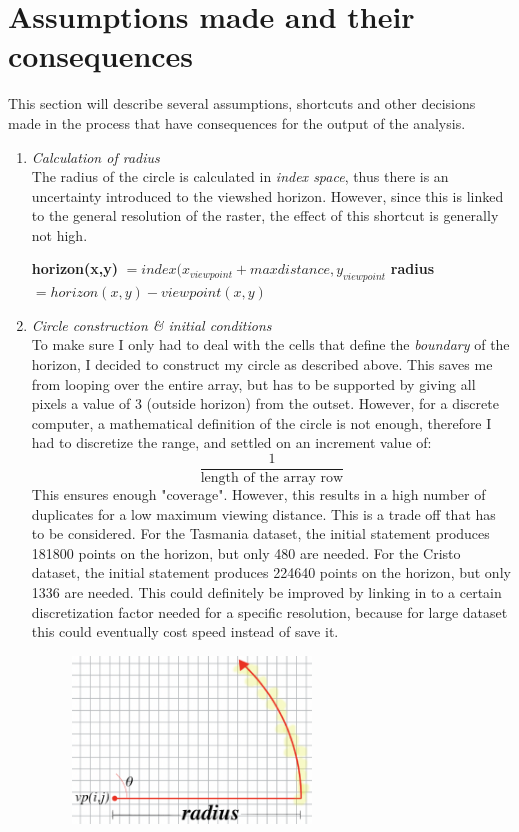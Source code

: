 \documentclass[a4paper]{article}
\begin{document}
\section*{Assumptions made and their consequences}
This section will describe several assumptions, shortcuts and other decisions made in the process that have consequences for the output of the analysis.
\begin{enumerate}
    \item\emph{{Calculation of radius}}\\
    The radius of the circle is calculated in \textit{index space}, thus there is an uncertainty introduced to the viewshed horizon. However, since this is linked to the general resolution of the raster, the effect of this shortcut is generally not high. 
   \begin{algorithm}[H]
	\begin{algorithmic}[1]
	\State \textbf{horizon(x,y)} $= index(x_{viewpoint}+maxdistance,y_{viewpoint}$
	\State \textbf{radius} $= horizon(x,y) - viewpoint(x,y)$
	\end{algorithmic} 
\end{algorithm} 
    \item\emph{{Circle construction \& initial conditions}}\\
    To make sure I only had to deal with the cells that define the \textit{boundary} of the horizon, I decided to construct my circle as described above. This saves me from looping over the entire array, but has to be supported by giving all pixels a value of 3 (outside horizon) from the outset. However, for a discrete computer, a mathematical definition of the circle is not enough, therefore I had to discretize the range, and settled on an increment value of: \[\dfrac{1}{\text{length of the array row}}\]
    This ensures enough "coverage". However, this results in a high number of duplicates for a low maximum viewing distance. This is a trade off that has to be considered. For the Tasmania dataset, the initial statement produces 181800 points on the horizon, but only 480 are needed. For the Cristo dataset, the initial statement produces 224640 points on the horizon, but only 1336 are needed. This could definitely be improved by linking in to a certain discretization factor needed for a specific resolution, because for large dataset this could eventually cost speed instead of save it.
    \begin{figure}[H]    
\centering
\includegraphics[width = 0.6\textwidth]{images/circle.png}

\end{figure}
\end{enumerate}
\end{document}
